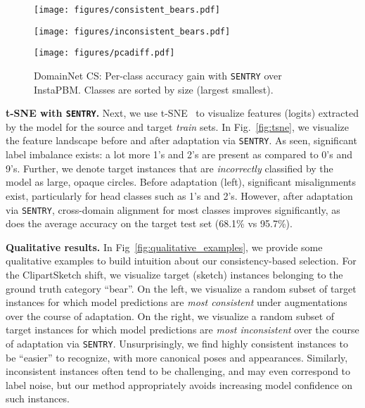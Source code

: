 \documentclass[10pt,twocolumn,letterpaper]{article}
\newcommand{\method}{\texttt{SENTRY}\xspace}
\begin{document}
\begin{figure*}[b]
    \centering
    \begin{subfigure}[b]{0.3\textwidth}  
        \centering 
        \texttt{[image: figures/consistent\_bears.pdf]}
        \caption[]{{}}   
        \label{fig:consistent_bears}
    \end{subfigure}
    \begin{subfigure}[b]{0.3\textwidth}
        \centering
        \texttt{[image: figures/inconsistent\_bears.pdf]}
        \caption[]{{}}
        \label{fig:inconsistent_bears}
    \end{subfigure}
    \caption[]
    {DomainNet ClipartSketch: Visualizing most consistent and inconsistent target instances.}
    \label{fig:qualitative_examples}
\end{figure*}


\begin{figure}[H]
    \centering
    \texttt{[image: figures/pcadiff.pdf]}
    \caption{{\small
    DomainNet CS: Per-class accuracy gain with \method over InstaPBM. Classes are sorted by size (largest  smallest). }}
    \label{fig:pcadiff}
    \vspace{-10pt}
 \end{figure}

\noindent \textbf{t-SNE with \method.} Next, we use t-SNE~\cite{maaten2008visualizing} to visualize features (logits) extracted by the model for the source and target \emph{train} sets. In Fig.~\ref{fig:tsne}, we visualize the feature landscape before and after adaptation via \method. As seen, significant label imbalance exists: \eg a lot more 1's and 2's are present as compared to 0's and 9's. Further, we denote target instances that are \emph{incorrectly} classified by the model as large, opaque circles. Before adaptation (left), significant misalignments exist, particularly for head classes such as 1's and 2's. However, after adaptation via \method, cross-domain alignment for most classes improves significantly, as does the average accuracy on the target test set (68.1\% vs 95.7\%).


\noindent \textbf{Qualitative results.} In Fig~\ref{fig:qualitative_examples}, we provide some qualitative examples to build intuition about our consistency-based selection. For the ClipartSketch shift, we visualize target (\ie sketch) instances belonging to the ground truth category ``bear''. On the left, we visualize a random subset of target instances for which model predictions are \emph{most consistent} under augmentations over the course of adaptation. On the right, we visualize a random subset of target instances for which model predictions are \emph{most inconsistent} over the course of adaptation via \method. Unsurprisingly, we find highly consistent instances to be ``easier'' to recognize, with more canonical poses and appearances. Similarly, inconsistent instances often tend to be challenging, and may even correspond to label noise, but our method appropriately avoids increasing model confidence on such instances.
\end{document}

